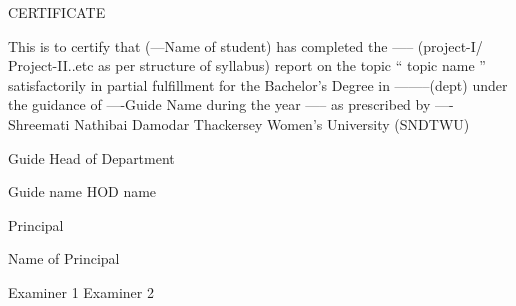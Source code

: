 
\newpage
\thispagestyle{empty}
\begin{center}
\LARGE{CERTIFICATE}
\end{center}


\vspace{2cm}

This is to certify that  (---Name of student) has completed the -----
(project-I/ Project-II..etc as per structure  of syllabus)
 report on the topic `` topic name '' satisfactorily in partial fulfillment for the Bachelor's Degree in --------(dept) under the guidance of ----Guide Name during the year ----- as prescribed by ---- Shreemati Nathibai Damodar Thackersey Women's University (SNDTWU) 
\vspace{3cm}

\begin{flushleft}
Guide \hspace{95.00mm} Head of Department\newline



Guide name \hspace{80.00mm}    HOD name
\end{flushleft}



\vspace{2cm}
\begin{center}
Principal



Name of Principal
\end{center}

\vspace{2cm}
\begin{flushleft}
Examiner 1 \hspace{100.00mm} Examiner 2
\end{flushleft}

\newpage




